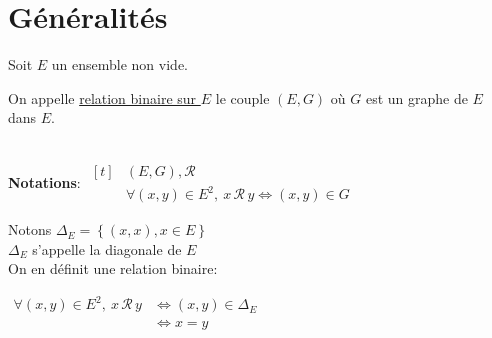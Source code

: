 \documentclass[12pt,twoside,a4paper]{article}
\author{MPSI 2}
\begin{document}
	\maketitle
	\section{G\'en\'eralit\'es}
		Soit $E$ un ensemble non vide.
		\begin{defi}
			On appelle \underline{relation binaire sur $E$} le couple $(E,G)$ o\`u $G$ est un graphe de $E$ dans $E$.
		\end{defi}\ \\
		\textbf{Notations}: $\begin{aligned}[t]&(E,G), \mathcal{R}\\
					&\forall(x,y)\in E^2,\ x\,\mathcal{R}\,y\iff(x,y)\in G\end{aligned}$
		\begin{tab}
			Notons $\Delta_E=\left\{(x,x),x\in E\right\}$\\
			$\Delta_E$ s'appelle la diagonale de $E$\\
			On en d\'efinit une relation binaire:
			\begin{tab}
				$\begin{aligned}\forall(x,y)\in E^2,\ x\,\mathcal{R}\,y&\iff(x,y)\in\Delta_E\\
					&\iff x=y\end{aligned}$
			\end{tab}
		\end{tab}
\end{document}
